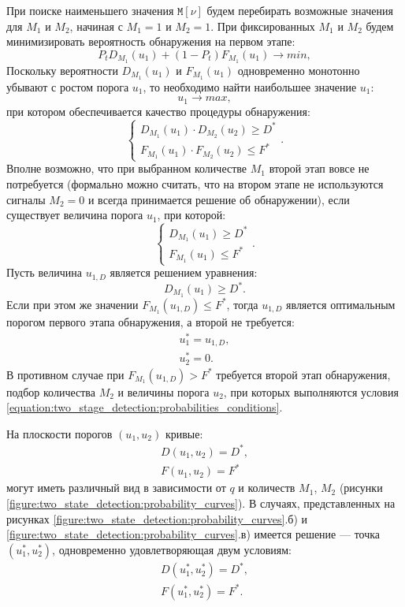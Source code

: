 \documentclass[a4paper,12pt]{article}
\newcommand{\expectation}[1]{\mathtt{M} \left [ #1 \right ]}
\begin{document}
    При поиске наименьшего значения $\expectation{\nu}$ будем перебирать возможные значения для $M_1$ и $M_2$, начиная с $M_1 = 1$ и $M_2 = 1$. При фиксированных $M_1$ и
    $M_2$ будем минимизировать вероятность обнаружения на первом этапе:
    \[
        P_t D_{M_1}(u_1) + \left ( 1 - P_t \right ) F_{M_1}(u_1) \rightarrow min ,
    \]
    Поскольку вероятности $D_{M_1}(u_1)$ и $F_{M_1}(u_1)$ одновременно монотонно убывают с ростом порога $u_1$, то необходимо найти наибольшее значение $u_1$:
    \[
        u_1 \rightarrow max,
    \]
    при котором обеспечивается качество процедуры обнаружения:
    \begin{equation}
        \label{equation:two_stage_detection:probabilities_conditions}
        \left \{
        \begin{array}{l}
            D_{M_1}(u_1) \cdot D_{M_2}(u_2) \ge D^* \\
            F_{M_1}(u_1) \cdot F_{M_2}(u_2) \le F^*
        \end{array}
        \right .
        .
    \end{equation}
    Вполне возможно, что при выбранном количестве $M_1$ второй этап вовсе не потребуется (формально можно считать, что на втором этапе не используются сигналы $M_2 = 0$
    и всегда принимается решение об обнаружении), если существует величина порога $u_1$, при которой:
    \[
        \left \{
        \begin{array}{l}
            D_{M_1}(u_1) \ge D^* \\
            F_{M_1}(u_1) \le F^*
        \end{array}
        \right .
        .
    \]
    Пусть величина $u_{1,D}$ является решением уравнения:
    \[
        D_{M_1}(u_1) \ge D^* .
    \]
    Если при этом же значении $F_{M_1}(u_{1,D}) \le F^*$, тогда $u_{1,D}$ является оптимальным порогом первого этапа обнаружения, а второй не требуется:
    \begin{gather*}
        u_1^* = u_{1,D} , \\
        u_2^* = 0 .
    \end{gather*}
    В противном случае при $F_{M_1}(u_{1,D}) > F^*$ требуется второй этап обнаружения, подбор количества $M_2$ и величины порога $u_2$, при которых выполняются условия
    \eqref{equation:two_stage_detection:probabilities_conditions}.

    На плоскости порогов $(u_1, u_2)$ кривые:
    \begin{gather*}
        D (u_1, u_2) = D^* , \\
        F (u_1, u_2) = F^*
    \end{gather*}
    могут иметь различный вид в зависимости от $q$ и количеств $M_1$, $M_2$ (рисунки \ref{figure:two_state_detection:probability_curves}). В случаях, представленных
    на рисунках \ref{figure:two_state_detection:probability_curves}.б) и \ref{figure:two_state_detection:probability_curves}.в) имеется решение --- точка
    $\left (u_1^*, u_2^* \right )$, одновременно удовлетворяющая двум условиям:
    \begin{gather*}
        D (u_1^*, u_2^*) = D^* , \\
        F (u_1^*, u_2^*) = F^* .
    \end{gather*}
\end{document}
